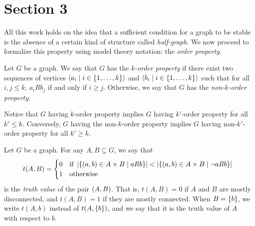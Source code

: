 \section{Section 3} \label{sec:section_3}

    All this work holds on the idea that a sufficient condition for a graph to be stable is the absence of
    a certain kind of structure called \emph{half-graph}.
    We now proceed to formalize this property using model theory notation: the \emph{order property}.

    \begin{definition} \label{def:k_order_property}
        Let $G$ be a graph.
        We say that $G$ has the \emph{$k$-order property} if there exist two sequences of vertices
        $\left< a_i \mid i \in \left\{ 1, \dots, k \right\} \right>$ and $\left< b_i \mid i \in \left\{ 1, \dots, k \right\} \right>$ such that
        for all $i,j \leq k$, $a_i R b_j$ if and only if $i \geq j$.
        Otherwise, we say that $G$ has the \emph{non-$k$-order property}.
    \end{definition}


    \begin{remark}
        Notice that $G$ having $k$-order property implies $G$ having $k'$-order property for all $k' \leq k$.
        Conversely, $G$ having the non-$k$-order property implies $G$ having non-$k'$-order property for all $k' \geq k$.
    \end{remark}

    \begin{definition} \label{def:truth_value}
        Let $G$ be a graph.
        For any $A, B \subseteq G$, we say that
        \[
            t(A,B) =
            \begin{cases}
                0 & \text{if } \left| \left\{ \left( a, b \right) \in A \times B \mid a R b \right\} \right| <
                    \left| \left\{ \left( a, b \right) \in A \times B \mid \neg a R b \right\} \right| \\
                1 & \text{otherwise}
            \end{cases}
        \]
        is the \emph{truth value} of the pair $\left( A,B \right)$.
        That is, $t(A,B) = 0$ if $A$ and $B$ are mostly disconnected, and $t(A,B) = 1$ if they are mostly connected.
        When $B = \left\{ b \right\}$, we write $t(A,b)$ instead of $t(A,\left\{ b \right\})$, and we say that it is the truth value of $A$
        with respect to $b$.
    \end{definition}

